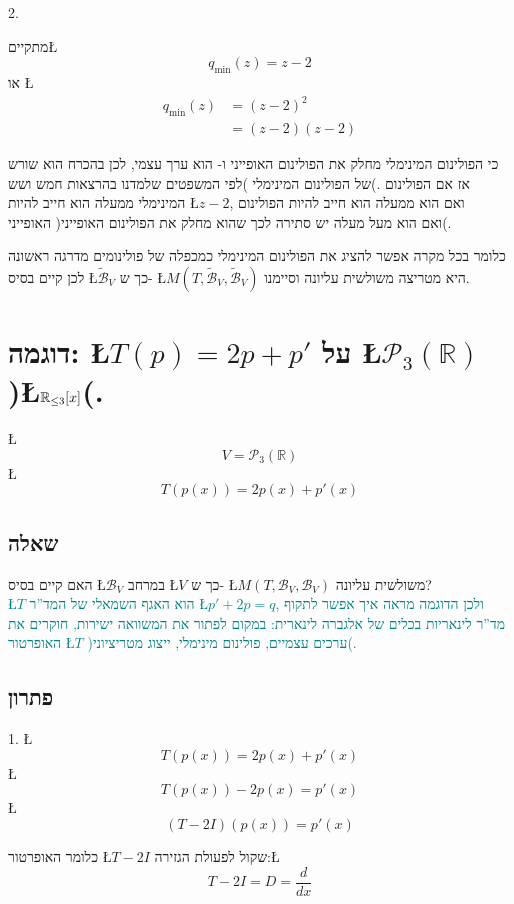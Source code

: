 \documentclass[english,hebrew]{article}
\begin{document}
2. 

מתקיים\L{%
\[
q_{\min}(z)=z-2
\]
}%
או \L{%
\begin{align*}
q_{\min}(z) & =(z-2)^{2}\\
 & =(z-2)(z-2)
\end{align*}
}%

כי הפולינום המינימלי מחלק את הפולינום האופייני ו-{\endL}
הוא ערך עצמי, לכן בהכרח {\endL} הוא שורש של הפולינום המינימלי
)לפי המשפטים שלמדנו בהרצאות חמש ושש(. אז אם הפולינום המינימלי ממעלה
{\endL} הוא חייב להיות \L{$z-2$}, ואם הוא ממעלה {\endL}
הוא חייב להיות הפולינום האופייני )ואם הוא מעל מעלה {\endL}
יש סתירה לכך שהוא מחלק את הפולינום האופייני(.

כלומר בכל מקרה אפשר להציג את הפולינום המינימלי כמכפלה של פולינומים
מדרגה ראשונה לכן קיים בסיס \L{$\widetilde{\mathcal{B}}_{V}$} כך ש-
\L{$M(T,\widetilde{\mathcal{B}}_{V},\widetilde{\mathcal{B}}_{V})$}
היא מטריצה משולשית עליונה וסיימנו.

\section{דוגמה: \L{$T(p)=2p+p'$} על \L{$\mathcal{P}_{3}(\mathbb{R})$} )\L{$\mathbb{R}_{\protect\leq3}[x]$}(.}

\L{%
\[
V=\mathcal{P}_{3}(\mathbb{R})
\]
}%
\L{%
\[
T(p(x))=2p(x)+p'(x)
\]
}%

\subsection{שאלה}

האם קיים בסיס \L{$\mathcal{B}_{V}$} במרחב \L{$V$} כך ש- \L{$M(T,\mathcal{B}_{V},\mathcal{B}_{V})$}
משולשית עליונה?\\

\textcolor{teal}{\L{$T$} הוא האגף השמאלי של המד\textquotedblright ר
\L{$p'+2p=q$}, ולכן הדוגמה מראה איך אפשר לתקוף מד\textquotedblright ר
לינאריות בכלים של אלגברה לינארית: במקום לפתור את המשוואה ישירות, חוקרים
את האופרטור \L{$T$} )ערכים עצמיים, פולינום מינימלי, ייצוג מטריציוני(.}

\subsection{פתרון}

1. \L{%
\[
T(p(x))=2p(x)+p'(x)
\]
}%
\L{%
\[
T(p(x))-2p(x)=p'(x)
\]
}%
\L{%
\[
\left(T-2I\right)\left(p(x)\right)=p'(x)
\]
}%

כלומר האופרטור \L{$T-2I$} שקול לפעולת הגזירה:\L{%
\[
T-2I=D=\frac{d}{dx}
\]
}%
\end{document}
